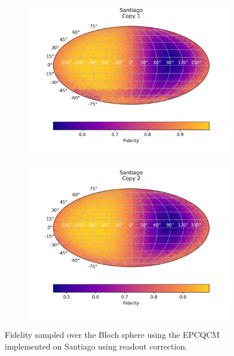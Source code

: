 \begin{figure}[H]
  \centering
  \begin{subfigure}{.5\textwidth}
    \centering
    \includegraphics[width=\textwidth]{Figures/Economical/IBM/FullSphere/results_corrected_santiago_copy1.png}
    
    \label{fig:epc_corrected_santiago_sphere_1}
  \end{subfigure}%
  \begin{subfigure}{.5\textwidth}
    \centering
    \includegraphics[width=\textwidth]{Figures/Economical/IBM/FullSphere/results_corrected_santiago_copy2.png}
    
    \label{fig:epc_corrected_santiago_sphere_2}
  \end{subfigure}
  \caption{Fidelity sampled over the Bloch sphere using the EPCQCM implemented on Santiago using readout correction.}
  \label{fig:epc_corrected_santiago_sphere}
\end{figure}

